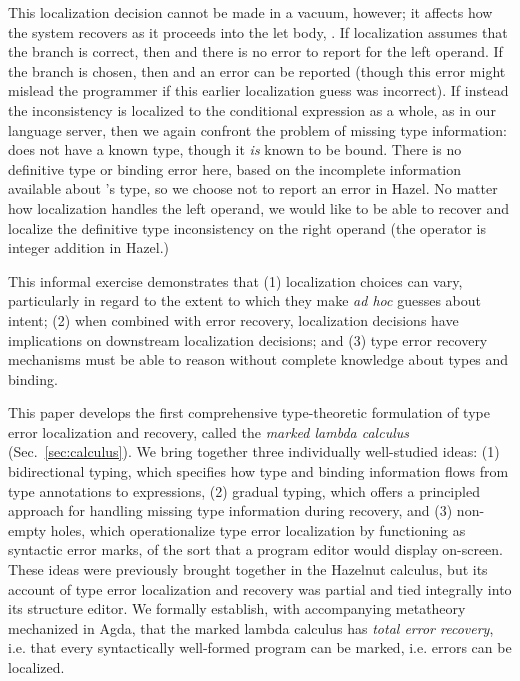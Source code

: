 This localization decision cannot be made in a vacuum, however; it affects how the system recovers as it proceeds into the let body, . 
If localization assumes that the  branch is correct, then  and there is no error to report for the left operand.
If the  branch is chosen, then  and an error can be reported (though this error might mislead the programmer if this earlier localization guess was incorrect). 
If instead the inconsistency is localized to the conditional expression as a whole, as in our language server, then we again confront the problem of missing type information: 
 does not have a known type,
though it \emph{is} known to be bound. 
There is no definitive type or binding error here, based on the incomplete information available about 's type, 
so we choose not to report an error in Hazel.
No matter how localization handles the left operand, we would like to be able to recover and 
localize the definitive type inconsistency on the right operand (the \li{+} operator is integer addition in Hazel.)

This informal exercise demonstrates that (1) localization choices can vary, particularly in regard to the extent to which they make \emph{ad hoc} guesses about intent;  
(2) when combined with error recovery, localization decisions have implications on downstream localization decisions; and 
(3) type error recovery mechanisms must be able to reason without complete knowledge about types and binding. 

This paper develops the first comprehensive {type-theoretic formulation} of type error localization and recovery, called the \emph{marked lambda calculus} (Sec.~\ref{sec:calculus}).
We bring together three individually well-studied ideas: (1) bidirectional typing, which specifies how type and binding information flows from 
type annotations to expressions, (2) gradual typing, which offers a principled approach for handling missing type information during recovery, and 
(3) non-empty holes, which operationalize type error localization by functioning as syntactic error marks, of the sort that a program editor would display on-screen.
These ideas were previously brought together in the Hazelnut calculus, but its account of type error localization and recovery was partial and tied integrally into its structure editor. 
We formally establish, with accompanying metatheory mechanized in Agda, that the marked lambda calculus has \emph{total error recovery}, i.e. that every syntactically well-formed program 
can be marked, i.e. errors can be localized. 



